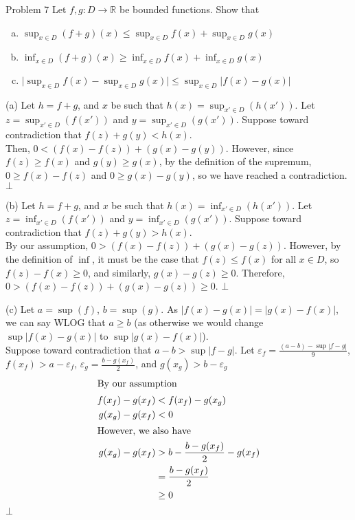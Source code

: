 \documentclass[9pt]{extarticle}
\newcommand{\R}{\mathbb{R}}
\begin{document}
  \begin{problem}{Problem 7}
    Let $f,g: D\rightarrow\R$ be bounded functions. Show that
    \begin{enumerate}[(a)]
      \item $\sup_{x\in D}(f+g)(x) \leq \sup_{x\in D}f(x) + \sup_{x\in D}g(x)$
      \item $\inf_{x\in D}(f+g)(x) \geq \inf_{x\in D}f(x) + \inf_{x\in D}g(x)$
      \item $\vert \sup_{x\in D}f(x) - \sup_{x\in D}g(x) \vert \leq \sup_{x\in D}\vert f(x) - g(x) \vert$
    \end{enumerate}
    \tcblower
    \begin{problem}{(a)}
      Let $h = f+g$, and $x$ be such that $h(x) = \sup_{x'\in D}(h(x'))$. Let $z = \sup_{x'\in D}(f(x'))$ and $y = \sup_{x'\in D}(g(x'))$. Suppose toward contradiction that $f(z) + g(y) < h(x)$.\\

      Then, $0 < (f(x) - f(z)) + (g(x) - g(y))$. However, since $f(z) \geq f(x)$ and $g(y) \geq g(x)$, by the definition of the supremum, $0 \geq f(x) - f(z)$ and $0\geq g(x) - g(y)$, so we have reached a contradiction. $\bot$
    \end{problem}
    \begin{problem}{(b)}
      Let $h = f+g$, and $x$ be such that $h(x) = \inf_{x'\in D}(h(x'))$. Let $z = \inf_{x'\in D}(f(x'))$ and $y = \inf_{x'\in D}(g(x'))$. Suppose toward contradiction that $f(z) + g(y) > h(x)$.\\

      By our assumption, $0 > (f(x) - f(z)) + (g(x) - g(z))$. However, by the definition of $\inf$, it must be the case that $f(z) \leq f(x)$ for all $x\in D$, so $f(z) - f(x) \geq 0$, and similarly, $g(x) - g(z) \geq 0$. Therefore, $0 > (f(x) - f(z)) + (g(x) - g(z)) \geq 0$. $\bot$
    \end{problem}
    \begin{problem}{(c)}
      Let $a = \sup(f)$, $b = \sup(g)$. As $|f(x) - g(x)| = |g(x) - f(x)|$, we can say WLOG that $a \geq b$ (as otherwise we would change $\sup|f(x) - g(x)|$ to $\sup|g(x) - f(x)|$).\\

      Suppose toward contradiction that $a-b > \sup|f-g|$. Let $\varepsilon_f = \frac{(a-b)-\sup|f-g|}{9}$, $f(x_f) > a - \varepsilon_{f}$, $\varepsilon_g = \frac{b - g(x_f)}{2}$, and $g(x_g) > b-\varepsilon_g$
      \begin{align*}
        \shortintertext{By our assumption}
        f(x_f) - g(x_f) &< f(x_f) - g(x_g)\\
        g(x_g) - g(x_f) &< 0\\
        \shortintertext{However, we also have}
        g(x_g) - g(x_f) &> b - \frac{b - g(x_f)}{2} - g(x_f)\\
                        &= \frac{b-g(x_f)}{2}\\
                        &\geq 0
      \end{align*}
      $\bot$
    \end{problem}
  \end{problem}
\end{document}
